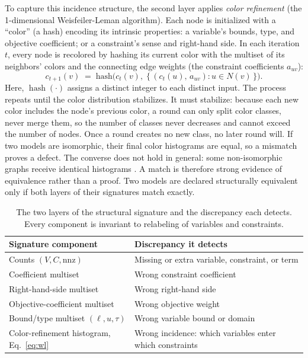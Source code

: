 \documentclass[runningheads]{llncs}
\begin{document}
To capture this incidence structure, the second layer applies \emph{color refinement} \cite{weisfeiler1968reduction} (the 1-dimensional Weisfeiler-Leman algorithm). Each node is initialized with a ``color'' (a hash) encoding its intrinsic properties: a variable's bounds, type, and objective coefficient; or a constraint's sense and right-hand side. In each iteration $t$, every node is recolored by hashing its current color with the multiset of its neighbors' colors and the connecting edge weights (the constraint coefficients $a_{uv}$):
\begin{equation}
c_{t+1}(v) \;=\; \mathrm{hash}\!\Big( c_t(v),\; \big\{\, (c_t(u),\, a_{uv}) : u \in N(v) \,\big\} \Big).
\label{eq:wl}
\end{equation}
Here, $\operatorname{hash}(\cdot)$ assigns a distinct integer to each distinct input. The process repeats until the color distribution stabilizes. It must stabilize: because each new color includes the node's previous color, a round can only split color classes, never merge them, so the number of classes never decreases and cannot exceed the number of nodes. Once a round creates no new class, no later round will. If two models are isomorphic, their final color histograms are equal, so a mismatch proves a defect. The converse does not hold in general: some non-isomorphic graphs receive identical histograms \cite{chen2023representing,wang2025orgeval}. A match is therefore strong evidence of equivalence rather than a proof. Two models are declared structurally equivalent only if both layers of their signatures match exactly.

\begin{table}[tb]
\centering
\caption{The two layers of the structural signature and the discrepancy each detects. Every component is invariant to relabeling of variables and constraints.}
\label{tab:signature}
\small
\begin{tabular}{@{}p{}p{}@{}}
\toprule
\textbf{Signature component} & \textbf{Discrepancy it detects} \\
\midrule
Counts $(V, C, \mathrm{nnz})$ & Missing or extra variable, constraint, or term \\
Coefficient multiset & Wrong constraint coefficient \\
Right-hand-side multiset & Wrong right-hand side \\
Objective-coefficient multiset & Wrong objective weight \\
Bound/type multiset $(\ell, u, \tau)$ & Wrong variable bound or domain \\
\midrule
Color-refinement histogram, Eq.~\eqref{eq:wl} & Wrong incidence: which variables enter which constraints \\
\bottomrule
\end{tabular}
\end{table}
\end{document}
